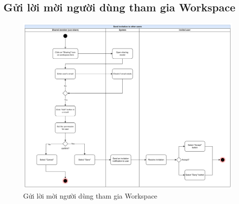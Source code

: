 \subsection{Gửi lời mời người dùng tham gia Workspace}
    \begin{figure}[H]
        \centering
        \includegraphics[width=\linewidth]{Content/Phân tích và thiết kế hệ thống/documents/Sơ đồ hoạt động/images/sendInvitation.png}
        \vspace{0.5cm}
        \caption{Gửi lời mời người dùng tham gia Workspace}
        \label{fig:Gửi lời mời người dùng tham gia Workspace}
    \end{figure}